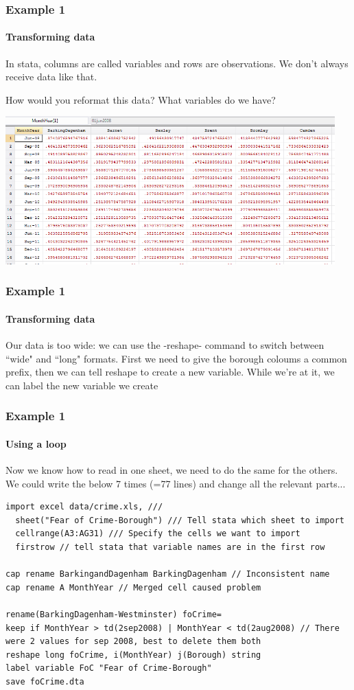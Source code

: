 \documentclass{beamer}
\begin{document}
\begin{frame}
  \frametitle{Example 1}
  \framesubtitle{Transforming data}
In stata, columns are called variables and rows are observations. We don't always receive data like that.

\smallskip

How would you reformat this data? What variables do we have?

\includegraphics[width=5in]{data.PNG}
\end{frame}


\begin{frame}
  \frametitle{Example 1}
  \framesubtitle{Transforming data}
Our data is too wide: we can use the -reshape- command to switch between ``wide" and ``long" formats. First we need to give the borough coloums a common prefix, then we can tell reshape to create a new variable. While we're at it, we can label the new variable we create



\end{frame}

\begin{frame}[fragile]
  \frametitle{Example 1}
  \framesubtitle{Using a loop}

Now we know how to read in one sheet, we need to do the same for the others. We could write the below 7 times  (=77 lines) and change all the relevant parts...

\scriptsize
\begin{verbatim}
import excel data/crime.xls, ///
  sheet("Fear of Crime-Borough") /// Tell stata which sheet to import
  cellrange(A3:AG31) /// Specify the cells we want to import
  firstrow // tell stata that variable names are in the first row
	
cap rename BarkingandDagenham BarkingDagenham // Inconsistent name
cap rename A MonthYear // Merged cell caused problem

rename(BarkingDagenham-Westminster) foCrime=
keep if MonthYear > td(2sep2008) | MonthYear < td(2aug2008) // There were 2 values for sep 2008, best to delete them both
reshape long foCrime, i(MonthYear) j(Borough) string
label variable FoC "Fear of Crime-Borough"
save foCrime.dta
\end{verbatim}

\end{frame}
\end{document}
